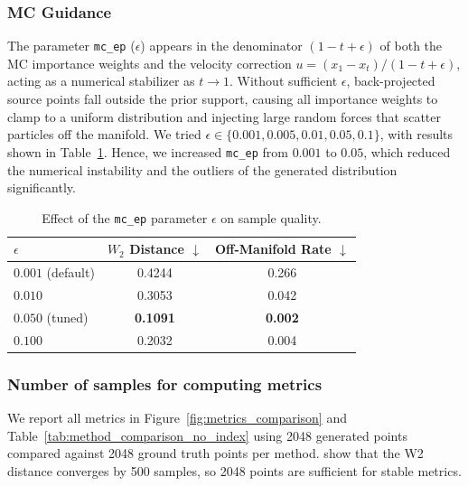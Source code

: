 \documentclass{article}
\begin{document}
\subsubsection{MC Guidance}
The parameter \texttt{mc\_ep} ($\epsilon$) appears in the denominator $(1-t+\epsilon)$ of both the MC importance weights and the velocity correction $u = (x_1 - x_t)/(1-t+\epsilon)$, acting as a numerical stabilizer as $t \to 1$.
Without sufficient $\epsilon$, back-projected source points fall outside the prior support, causing all importance weights to clamp to a uniform distribution and injecting large random forces that scatter particles off the manifold.
We tried $\epsilon \in \{0.001, 0.005, 0.01, 0.05, 0.1\}$, with results shown in Table~\ref{tab:mc_ep_search}.
Hence, we increased \texttt{mc\_ep} from $0.001$ to $0.05$, which reduced the numerical instability and the outliers of the generated distribution significantly.

\begin{table}[htbp]
\centering
\caption{Effect of the \texttt{mc\_ep} parameter $\epsilon$ on sample quality.}
\label{tab:mc_ep_search}
\begin{tabular}{lcc}
\toprule
$\epsilon$ & $W_2$ Distance $\downarrow$ & Off-Manifold Rate $\downarrow$ \\
\midrule
$0.001$ (default) & 0.4244 & 0.266 \\
$0.010$           & 0.3053 & 0.042 \\
$0.050$ (tuned)   & \textbf{0.1091} & \textbf{0.002} \\
$0.100$           & 0.2032 & 0.004 \\
\bottomrule
\end{tabular}
\end{table}

\subsubsection{Number of samples for computing metrics}

We report all metrics in Figure~\ref{fig:metrics_comparison} and Table~\ref{tab:method_comparison_no_index} using 2048 generated points compared against 2048 ground truth points per method.
\citet{feng25s_guidance} show that the W2 distance converges by 500 samples, so 2048 points are sufficient for stable metrics.


% 
\end{document}
